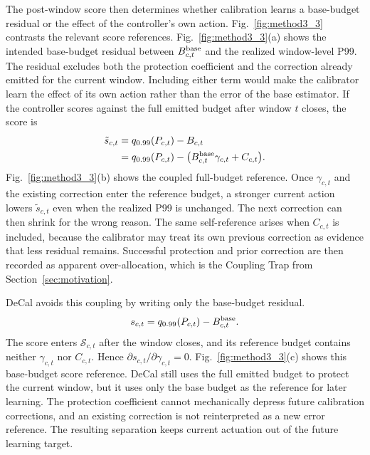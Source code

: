\documentclass[sigplan,10pt, anonymous]{acmart}
\begin{document}
The post-window score then determines whether calibration learns a base-budget residual or the effect of the controller's own action. Fig.~\ref{fig:method3_3} contrasts the relevant score references. Fig.~\ref{fig:method3_3}(a) shows the intended base-budget residual between $B_{c,t}^{\rm base}$ and the realized window-level P99. The residual excludes both the protection coefficient and the correction already emitted for the current window. Including either term would make the calibrator learn the effect of its own action rather than the error of the base estimator. If the controller scores against the full emitted budget after window $t$ closes, the score is
\begin{equation}
\label{eq:coupled_score}
\begin{aligned}
\tilde{s}_{c,t}
&= q_{0.99}(P_{c,t})-B_{c,t} \\
&= q_{0.99}(P_{c,t})
 - \bigl(B_{c,t}^{\rm base}\gamma_{c,t}+C_{c,t}\bigr) .
\end{aligned}
\end{equation}
Fig.~\ref{fig:method3_3}(b) shows the coupled full-budget reference. Once $\gamma_{c,t}$ and the existing correction enter the reference budget, a stronger current action lowers $\tilde{s}_{c,t}$ even when the realized P99 is unchanged. The next correction can then shrink for the wrong reason. The same self-reference arises when $C_{c,t}$ is included, because the calibrator may treat its own previous correction as evidence that less residual remains. Successful protection and prior correction are then recorded as apparent over-allocation, which is the Coupling Trap from Section~\ref{sec:motivation}.

DeCal avoids this coupling by writing only the base-budget residual.
\begin{equation}
\label{eq:decoupled_score}
s_{c,t}=q_{0.99}(P_{c,t})-B_{c,t}^{\rm base}.
\end{equation}
The score enters $\mathcal{S}_{c,t}$ after the window closes, and its reference budget contains neither $\gamma_{c,t}$ nor $C_{c,t}$. Hence $\partial s_{c,t}/\partial \gamma_{c,t}=0$. Fig.~\ref{fig:method3_3}(c) shows this base-budget score reference. DeCal still uses the full emitted budget to protect the current window, but it uses only the base budget as the reference for later learning. The protection coefficient cannot mechanically depress future calibration corrections, and an existing correction is not reinterpreted as a new error reference. The resulting separation keeps current actuation out of the future learning target.
\end{document}
